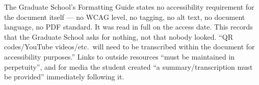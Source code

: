 %
	{The Graduate School's Formatting Guide states no accessibility requirement
	 for the document itself — no WCAG level, no tagging, no alt text, no
	 document language, no PDF standard. It was read in full on the access date.
	 This records that the Graduate School asks for nothing, not that nobody
	 looked.}
	{``QR codes/YouTube videos/etc.\ will need to be transcribed within the
	 document for accessibility purposes.'' Links to outside resources ``must be
	 maintained in perpetuity'', and for media the student created ``a
	 summary/transcription must be provided'' immediately following it.}

